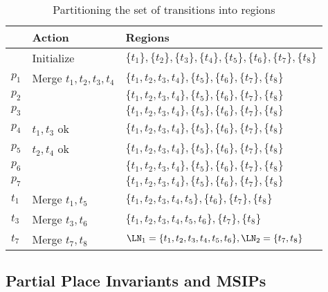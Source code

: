 \begin{table}
  {\centering
    \begin{tabular}{@{}lll@{}}
      \toprule
      & Action & Regions \\
      \midrule
      & Initialize & $\{t_1\}, \{t_2\}, \{t_3\}, \{t_4\}, \{t_5\},
                     \{t_6\}, \{t_7\}, \{t_8\}$ \\[0.5em]
      $p_1$ & Merge $t_1, t_2, t_3, t_4$ & $\{t_1, t_2, t_3, t_4\}, \{t_5\},
                     \{t_6\}, \{t_7\}, \{t_8\}$ \\
      $p_2$ & & $\{t_1, t_2, t_3, t_4\}, \{t_5\},
                     \{t_6\}, \{t_7\}, \{t_8\}$ \\
      $p_3$ & & $\{t_1, t_2, t_3, t_4\}, \{t_5\},
                     \{t_6\}, \{t_7\}, \{t_8\}$ \\
      $p_4$ & $t_1, t_3$ ok & $\{t_1, t_2, t_3, t_4\}, \{t_5\},
                     \{t_6\}, \{t_7\}, \{t_8\}$ \\
      $p_5$ & $t_2, t_4$ ok & $\{t_1, t_2, t_3, t_4\}, \{t_5\},
                     \{t_6\}, \{t_7\}, \{t_8\}$ \\
      $p_6$ & & $\{t_1, t_2, t_3, t_4\}, \{t_5\},
                     \{t_6\}, \{t_7\}, \{t_8\}$ \\
      $p_7$ & & $\{t_1, t_2, t_3, t_4\}, \{t_5\},
                     \{t_6\}, \{t_7\}, \{t_8\}$ \\[0.5em]
      $t_1$ & Merge $t_1, t_5$ & $\{t_1, t_2, t_3, t_4, t_5\},
                     \{t_6\}, \{t_7\}, \{t_8\}$ \\
      $t_3$ & Merge $t_3, t_6$ & $\{t_1, t_2, t_3, t_4, t_5, t_6\},
                     \{t_7\}, \{t_8\}$ \\[0.5em]
      $t_7$ & Merge $t_7, t_8$ & $\LN_1 = \{t_1, t_2, t_3, t_4, t_5, t_6\},
                     \LN_2 = \{t_7, t_8\}$ \\
      \bottomrule
    \end{tabular}
    \par}
  \caption{Partitioning the set of transitions into regions}
  \label{tbl:example:partition}
\end{table}

\subsection{Partial Place Invariants and MSIPs}

